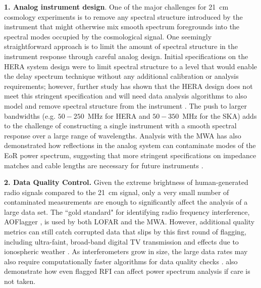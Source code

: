 \textbf{1. Analog instrument design}.  One of the major challenges for 21~cm cosmology experiments is to remove any spectral structure introduced by the instrument that might otherwise mix smooth spectrum foregrounds into the spectral modes occupied by the cosmological signal.  One seemingly straightforward approach is to limit the amount of spectral structure in the instrument response through careful analog design.  Initial specifications on the HERA system design were to limit spectral structure to a level that would enable the delay spectrum technique without any additional calibration or analysis requirements; however, further study has shown that the HERA design does not meet this stringent specification and will need data analysis algorithms to also model and remove spectral structure from the instrument \cite{deboer16}.  The push to larger bandwidths (e.g. $50-250$\, MHz for HERA and $50-350$\, MHz for the SKA) adds to the challenge of constructing a single instrument with a smooth spectral response over a large range of wavelengths.  Analysis with the MWA has also demonstrated how reflections in the analog system can contaminate modes of the EoR power spectrum, suggesting that more stringent specifications on impedance matches and cable lengths are necessary for future instruments \cite{barry16,ewall-wice17}.

\textbf{2. Data Quality Control.} Given the extreme brightness of human-generated radio signals compared to the 21~cm signal, only a very small number of contaminated measurements are enough to significantly affect the analysis of a large data set.  The ``gold standard" for identifying radio frequency interference, AOFlagger \cite{offringa12}, is used by both LOFAR and the MWA.  However, additional quality metrics can still catch corrupted data that slips by this first round of flagging, including ultra-faint, broad-band digital TV transmission \cite{wilensky19} and effects due to ionospheric weather \cite{trott18,jordan16}.  As interferometers grow in size, the large data rates may also require computationally faster algorithms for data quality checks \cite{kerrigan19}. \cite{offringa19} also demonstrate how even flagged RFI can affect power spectrum analysis if care is not taken.

